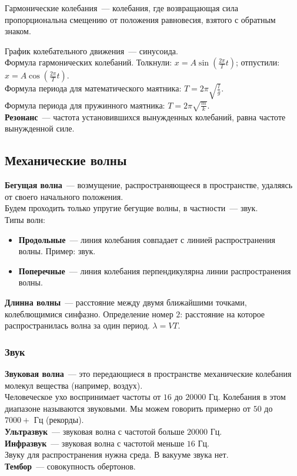 \documentclass[12pt]{article}
\begin{document}
	\begin{definition}
		Гармонические колебания~--- колебания, где возвращающая сила пропорциональна смещению от положения равновесия, взятого с обратным знаком.
	\end{definition}
	\noindent
	График колебательного движения~--- синусоида.\\
	Формула гармонических колебаний. Толкнули: $x = A \sin (\frac{2\pi}{T} t)$; отпустили: $x = A \cos (\frac{2\pi}{T} t)$.\\
	Формула периода для математического маятника: $T = 2\pi\sqrt{\frac{l}{g}}$.\\
	Формула периода для пружинного маятника: $T = 2\pi\sqrt{\frac{m}{k}}$.\\
	\textbf{Резонанс}~--- частота установившихся вынужденных колебаний, равна частоте вынужденной силе.
	\subsection{Механические волны}
	\textbf{Бегущая волна}~--- возмущение, распространяющееся в пространстве, удаляясь от своего начального положения.\\
	Будем проходить только упругие бегущие волны, в частности~--- звук.\\
	Типы волн:
	\begin{itemize}
		\item \textbf{Продольные}~--- линия колебания совпадает с линией распространения волны. Пример: звук.
		\item \textbf{Поперечные}~--- линия колебания перпендикулярна линии распространения волны.
	\end{itemize}
	\textbf{Длинна волны}~--- расстояние между двумя ближайшими точками, колеблющимися синфазно. Определение номер $2$: расстояние на которое распространилась волна за один период. $\lambda = VT$.
	\subsubsection{Звук}
	\textbf{Звуковая волна}~--- это передающиеся в пространстве механические колебания молекул вещества (например, воздух).\\
	Человеческое ухо воспринимает частоты от $16$ до $20000$ Гц. Колебания в этом диапазоне называются звуковыми. Мы можем говорить примерно от $50$ до $7000+$ Гц (рекорды).\\
	\textbf{Ультразвук}~--- звуковая волна с частотой больше $20000$ Гц.\\
	\textbf{Инфразвук}~--- звуковая волна с частотой меньше $16$ Гц.\\
	Звуку для распространения нужна среда. В вакууме звука нет.\\
	\textbf{Тембор}~--- совокупность обертонов.
\end{document}

